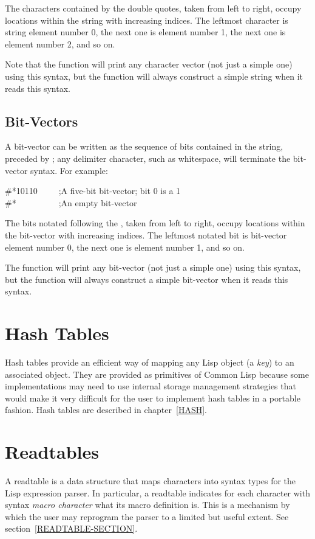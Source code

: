 The characters contained by the double quotes, taken from left to right,
occupy locations within the string with increasing indices.
The leftmost character is string element number 0, the next one
is element number 1, the next one is element number 2, and so on.

Note that the function  will print any character vector
(not just a simple one)
using this syntax, but the function  will always construct
a simple string when it reads this syntax.

\subsection{Bit-Vectors}

A bit-vector can be written as the sequence of bits contained in the
string, preceded by \cd{\#*}; any delimiter character, such as whitespace,
will terminate the bit-vector syntax.
For example:
\begin{lisp}
\#*10110~~~~~;\textrm{A five-bit bit-vector; bit 0 is a 1} \\
\#*~~~~~~~~~~;\textrm{An empty bit-vector}
\end{lisp}

The bits notated following the \cd{\#*}, taken from left to right,
occupy locations within the bit-vector with increasing indices.
The leftmost notated bit is bit-vector element number 0, the next one
is element number 1, and so on.

The function  will print any bit-vector (not just a simple one)
using this syntax, but the function  will always construct
a simple bit-vector when it reads this syntax.

\section{Hash Tables}
Hash tables provide an efficient way of mapping any
Lisp object (a \emph{key}) to an associated object.
They are provided as primitives of Common Lisp because
some implementations may need to use internal storage
management strategies that would make it very difficult
for the user to implement hash tables in a portable fashion.
Hash tables are described in chapter~\ref{HASH}.

\section{Readtables}

A readtable is a data structure that maps characters into syntax
types for the Lisp expression parser.
In particular, a readtable indicates for
each character with syntax \emph{macro character} what its macro
definition is.  This is a mechanism by which the user may reprogram
the parser to a limited but useful extent.
See section~\ref{READTABLE-SECTION}.

